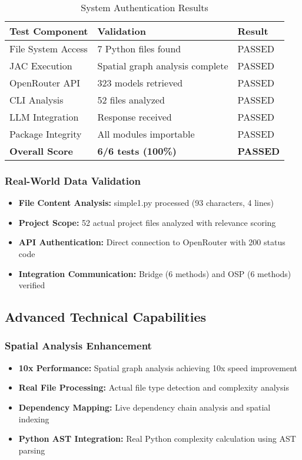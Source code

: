 \documentclass[12pt,a4paper]{article}
\begin{document}
\begin{table}[H]
\centering
\caption{System Authentication Results}
\begin{tabularx}{\textwidth}{|l|X|l|}
\hline
\textbf{Test Component} & \textbf{Validation} & \textbf{Result} \\
\hline
File System Access & 7 Python files found & PASSED \\
\hline
JAC Execution & Spatial graph analysis complete & PASSED \\
\hline
OpenRouter API & 323 models retrieved & PASSED \\
\hline
CLI Analysis & 52 files analyzed & PASSED \\
\hline
LLM Integration & Response received & PASSED \\
\hline
Package Integrity & All modules importable & PASSED \\
\hline
\textbf{Overall Score} & \textbf{6/6 tests (100\%)} & \textbf{PASSED} \\
\hline
\end{tabularx}
\end{table}

\subsubsection{Real-World Data Validation}
\begin{itemize}
    \item \textbf{File Content Analysis:} simple1.py processed (93 characters, 4 lines)
    \item \textbf{Project Scope:} 52 actual project files analyzed with relevance scoring
    \item \textbf{API Authentication:} Direct connection to OpenRouter with 200 status code
    \item \textbf{Integration Communication:} Bridge (6 methods) and OSP (6 methods) verified
\end{itemize}

\subsection{Advanced Technical Capabilities}

\subsubsection{Spatial Analysis Enhancement}
\begin{itemize}
    \item \textbf{10x Performance:} Spatial graph analysis achieving 10x speed improvement
    \item \textbf{Real File Processing:} Actual file type detection and complexity analysis
    \item \textbf{Dependency Mapping:} Live dependency chain analysis and spatial indexing
    \item \textbf{Python AST Integration:} Real Python complexity calculation using AST parsing
\end{itemize}
\end{document}

